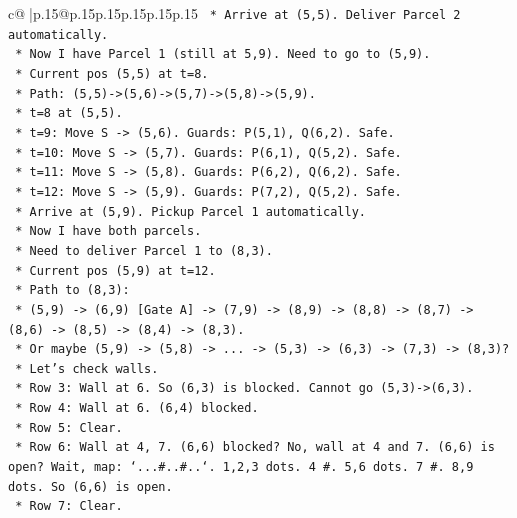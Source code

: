 \documentclass{article}
\begin{document}
{\begin{supertabular}{c@{$\;$}|p{.15\linewidth}@{}p{.15\linewidth}p{.15\linewidth}p{.15\linewidth}p{.15\linewidth}p{.15\linewidth}}
{{{\texttt{                *   Arrive at (5,5). Deliver Parcel 2 automatically.} \\
\texttt{            *   Now I have Parcel 1 (still at 5,9). Need to go to (5,9).} \\
\texttt{            *   Current pos (5,5) at t=8.} \\
\texttt{            *   Path: (5,5){-}>(5,6){-}>(5,7){-}>(5,8){-}>(5,9).} \\
\texttt{            *   t=8 at (5,5).} \\
\texttt{            *   t=9: Move S {-}> (5,6). Guards: P(5,1), Q(6,2). Safe.} \\
\texttt{            *   t=10: Move S {-}> (5,7). Guards: P(6,1), Q(5,2). Safe.} \\
\texttt{            *   t=11: Move S {-}> (5,8). Guards: P(6,2), Q(6,2). Safe.} \\
\texttt{            *   t=12: Move S {-}> (5,9). Guards: P(7,2), Q(5,2). Safe.} \\
\texttt{                *   Arrive at (5,9). Pickup Parcel 1 automatically.} \\
\texttt{            *   Now I have both parcels.} \\
\texttt{            *   Need to deliver Parcel 1 to (8,3).} \\
\texttt{            *   Current pos (5,9) at t=12.} \\
\texttt{            *   Path to (8,3):} \\
\texttt{                *   (5,9) {-}> (6,9) {[}Gate A{]} {-}> (7,9) {-}> (8,9) {-}> (8,8) {-}> (8,7) {-}> (8,6) {-}> (8,5) {-}> (8,4) {-}> (8,3).} \\
\texttt{                *   Or maybe (5,9) {-}> (5,8) {-}> ... {-}> (5,3) {-}> (6,3) {-}> (7,3) {-}> (8,3)?} \\
\texttt{                *   Let's check walls.} \\
\texttt{                *   Row 3: Wall at 6. So (6,3) is blocked. Cannot go (5,3){-}>(6,3).} \\
\texttt{                *   Row 4: Wall at 6. (6,4) blocked.} \\
\texttt{                *   Row 5: Clear.} \\
\texttt{                *   Row 6: Wall at 4, 7. (6,6) blocked? No, wall at 4 and 7. (6,6) is open? Wait, map: `...\#..\#..`. 1,2,3 dots. 4 \#. 5,6 dots. 7 \#. 8,9 dots. So (6,6) is open.} \\
\texttt{                *   Row 7: Clear.} \\
}}}
\end{supertabular}}
\end{document}
